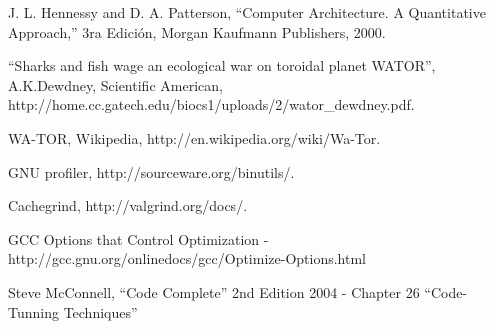 \documentclass[a4paper,10pt]{article}
\begin{document}
\begin{thebibliography}{99}

 J. L. Hennessy and D. A. Patterson, ``Computer Architecture. A Quantitative
Approach,'' 3ra Edici\'on, Morgan Kaufmann Publishers, 2000.

 ``Sharks and fish wage an ecological war on toroidal planet WATOR'', A.K.Dewdney, Scientific American,\\
http://home.cc.gatech.edu/biocs1/uploads/2/wator\_dewdney.pdf.

 WA-TOR, Wikipedia, http://en.wikipedia.org/wiki/Wa-Tor.

 GNU profiler, http://sourceware.org/binutils/.

 Cachegrind, http://valgrind.org/docs/.

 GCC Options that Control Optimization - http://gcc.gnu.org/onlinedocs/gcc/Optimize-Options.html

 Steve McConnell, ``Code Complete'' 2nd Edition 2004 - Chapter 26 ``Code-Tunning Techniques''

\end{thebibliography}
\end{document}
